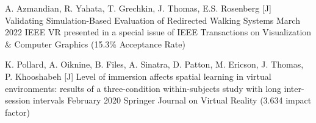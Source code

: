 





\begin{cvpubs}  
  \setcounter{npubs}{1}
  \cvpub
    {A. Azmandian, R. Yahata, T. Grechkin, J. Thomas, E.S. Rosenberg} %
    {[J\thenpubs] Validating Simulation-Based Evaluation of Redirected Walking Systems} %
    {March 2022} %
    {IEEE VR presented in a special issue of IEEE Transactions on Visualization \& Computer Graphics (15.3\% Acceptance Rate)} %
    
  \cvpub
    {K. Pollard, A. Oiknine, B. Files, A. Sinatra, D. Patton, M. Ericson, J. Thomas, P. Khooshabeh}
    {[J\thenpubs] Level of immersion affects spatial learning in virtual environments: results of a three-condition within-subjects study with long inter-session intervals}
    {February 2020}
    {Springer Journal on Virtual Reality (3.634 impact factor)}
\end{cvpubs}
   
